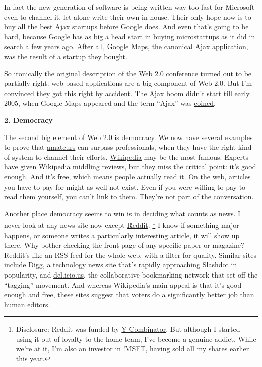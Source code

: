 \documentclass[12pt]{book}
\begin{document}
In fact the new generation of software is being written way too fast for
Microsoft even to channel it, let alone write their own in house. Their
only hope now is to buy all the best Ajax startups before Google does.
And even that's going to be hard, because Google has as big a head start
in buying microstartups as it did in search a few years ago. After all,
Google Maps, the canonical Ajax application, was the result of a startup
they
\href{http://googlemapsmania.blogspot.com/2005/10/google-maps-lead-engineer-gaze\%20s-into.html}{bought}.

So ironically the original description of the Web 2.0 conference turned
out to be partially right: web-based applications are a big component of
Web 2.0. But I'm convinced they got this right by accident. The Ajax
boom didn't start till early 2005, when Google Maps appeared and the
term ``Ajax'' was
\href{http://www.adaptivepath.com/publications/essays/archives/000385.php}{coined}.

\textbf{2. Democracy}

The second big element of Web 2.0 is democracy. We now have several
examples to prove that \href{opensource.html}{amateurs} can surpass
professionals, when they have the right kind of system to channel their
efforts. \href{http://wikipedia.org}{Wikipedia} may be the most famous.
Experts have given Wikipedia middling reviews, but they miss the
critical point: it's good enough. And it's free, which means people
actually read it. On the web, articles you have to pay for might as well
not exist. Even if you were willing to pay to read them yourself, you
can't link to them. They're not part of the conversation.

Another place democracy seems to win is in deciding what counts as news.
I never look at any news site now except
\href{http://reddit.com}{Reddit}. \footnote{Disclosure: Reddit was funded by \href{http://ycombinator.com}{Y
Combinator}. But although I started using it out of loyalty to the home
team, I've become a genuine addict. While we're at it, I'm also an
investor in !MSFT, having sold all my shares earlier this year.} I know if
something major happens, or someone writes a particularly interesting
article, it will show up there. Why bother checking the front page of
any specific paper or magazine? Reddit's like an RSS feed for the whole
web, with a filter for quality. Similar sites include
\href{http://digg.com}{Digg}, a technology news site that's rapidly
approaching Slashdot in popularity, and
\href{http://del.icio.us}{del.icio.us}, the collaborative bookmarking
network that set off the ``tagging'' movement. And whereas Wikipedia's
main appeal is that it's good enough and free, these sites suggest that
voters do a significantly better job than human editors.
\end{document}
